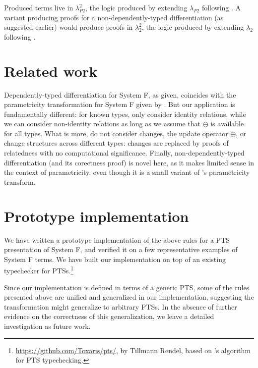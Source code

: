 Produced terms live in \ensuremath{\lambda_{P2}^2}, the logic produced by extending \ensuremath{\lambda_{P2}} following
\citeauthor{Bernardy2011realizability}. A variant producing proofs for a
non-dependently-typed differentiation (as suggested earlier) would produce
proofs in \ensuremath{\lambda_{2}^2}, the logic produced by extending \ensuremath{\lambda_{2}} following
\citeauthor{Bernardy2011realizability}.


\section{Related work}
Dependently-typed differentiation for System F, as given, coincides with the
parametricity transformation for System F given by \citet*[Sec.~3.1]{Bernardy10}. But our
application is fundamentally different: for known types, \citeauthor{Bernardy10}
only consider identity relations, while we can consider non-identity relations
as long as we assume that \ensuremath{\ominus } is available for all types.
What is more, \citeauthor{Bernardy10} do not consider changes, the update
operator \ensuremath{\oplus }, or change structures across different types: changes are
replaced by proofs of relatedness with no computational significance.
Finally, non-dependently-typed differentiation (and its corectness proof) is
novel here, as it makes limited sense in the context of parametricity, even
though it is a small variant of \citeauthor{Bernardy10}'s parametricity transform.

\section{Prototype implementation}
\label{sec:param-derive-implementation}
We have written a prototype implementation of the above rules for a PTS
presentation of System F, and verified it on a few representative examples of
System F terms. We have built our implementation on top of an existing
typechecker for PTSs.\footnote{\url{https://github.com/Toxaris/pts/}, by Tillmann
  Rendel, based on \citet{vanBenthemJutting1994checking}'s algorithm for
  PTS typechecking.}

Since our implementation is defined in terms of a generic PTS, some of the rules
presented above are unified and generalized in our implementation, suggesting
the transformation might generalize to arbitrary PTSs. In the absence of
further evidence on the correctness of this generalization, we leave a detailed
investigation as future work.

